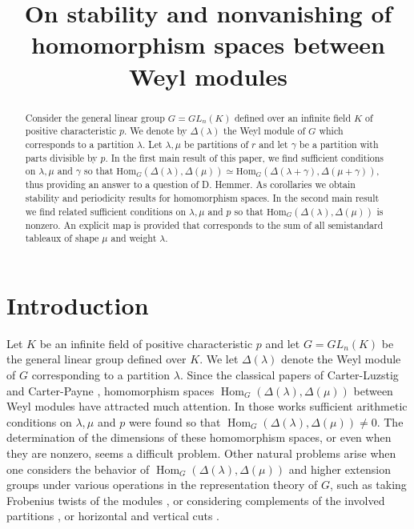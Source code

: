 \documentclass[ALCO,Unicode]{cedram}
\title[On stability and nonvanishing of hom spaces]{On stability and nonvanishing of homomorphism spaces between Weyl modules}
\author[\initial{C.} Evangelou]{\firstname{Charalambos} \lastname{Evangelou}}
\author[\initial{M.} Maliakas]{\firstname{Mihalis} \lastname{Maliakas}}
\author[\initial{D.-D.} Stergiopoulou]{\firstname{Dimitra-Dionysia} \lastname{Stergiopoulou}}
\DeclareMathOperator{\Hom}{Hom}
\numberwithin{equation}{section}
\begin{document}
	
		\begin{abstract}Consider the general linear group $G=GL_n(K)$ defined over an infinite field $K$ of positive characteristic $p$. We denote by $\Delta(\lambda)$ the Weyl module of $G$ which corresponds to a partition $\lambda$. Let $\lambda, \mu $ be partitions of $r$ and let $\gamma$ be a partition with parts divisible by $p$. In the first main result of this paper, we find sufficient conditions on $\lambda, \mu$ and $\gamma$ so that $\mathrm{Hom}_G(\Delta(\lambda),\Delta(\mu)) \simeq \mathrm{Hom}_G(\Delta(\lambda +\gamma),\Delta(\mu +\gamma))$, thus providing an answer to a question of D. Hemmer. As corollaries we obtain stability and periodicity results for homomorphism spaces. In the second main result we find related sufficient conditions on $\lambda, \mu$  and $p$ so that $\mathrm{Hom}_G(\Delta(\lambda),\Delta(\mu))$ is nonzero. An explicit map is provided that corresponds to the sum of all semistandard tableaux of shape $\mu$ and weight $\lambda$.
		\end{abstract}
\maketitle

\section{Introduction} Let $K$ be an infinite field of positive characteristic $p$ and let $G=GL_n(K)$ be the general linear group defined over $K$. We let $\Delta({\lambda})$ denote the Weyl module of $G$ corresponding to a partition $\lambda$. Since the classical papers of Carter-Luzstig \cite{CL} and Carter-Payne \cite{CP}, homomorphism spaces $\Hom_G(\Delta(\lambda), \Delta(\mu))$ between Weyl modules have attracted much attention. In those works sufficient arithmetic conditions on $\lambda, \mu$ and $p$ were found so that $\Hom_G(\Delta(\lambda), \Delta(\mu)) \neq 0$. The determination of the dimensions of these homomorphism spaces, or even when they are nonzero, seems a difficult problem. Other natural problems arise when one considers the behavior of $\Hom_G(\Delta(\lambda), \Delta(\mu))$ and higher extension groups under various operations in the representation theory of $G$, such as taking Frobenius twists of the modules \cite{CPSK}, or considering complements of the involved partitions \cite{FHKD}, or horizontal and vertical cuts \cite{FL, D, BG}.  
\end{document}
